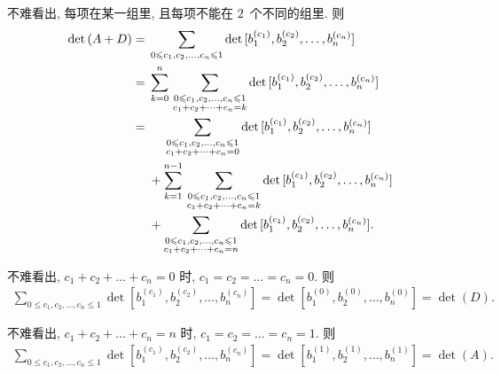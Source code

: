 \documentclass[../libro.tex]{subfiles}
\begin{document}
\begin{example}
    不难看出,
    每项在某一组里,
    且每项不能在 \(2\)~个不同的组里.
    则
    \begin{align*}
        \det {(A + D)}
        = {} &
        \sum_{0 \leq c_1, c_2, \dots, c_n \leq 1}
        \det {[b_1^{(c_1)}, b_2^{(c_2)}, \dots, b_n^{(c_n)}]}
        \\
        = {} &
        \sum_{k = 0}^{n}\,
        \sum_{\substack{0 \leq c_1, c_2, \dots, c_n \leq 1 \\
        c_1 + c_2 + \dots + c_n = k}}
        \det {[b_1^{(c_1)}, b_2^{(c_2)}, \dots, b_n^{(c_n)}]}
        \\
        = {} &
        \hphantom{{} + {}}
        \sum_{\substack{0 \leq c_1, c_2, \dots, c_n \leq 1 \\
        c_1 + c_2 + \dots + c_n = 0}}
        \det {[b_1^{(c_1)}, b_2^{(c_2)}, \dots, b_n^{(c_n)}]}
        \\
        &
        +
        \sum_{k = 1}^{n-1}\,
        \sum_{\substack{0 \leq c_1, c_2, \dots, c_n \leq 1 \\
        c_1 + c_2 + \dots + c_n = k}}
        \det {[b_1^{(c_1)}, b_2^{(c_2)}, \dots, b_n^{(c_n)}]}
        \\
        &
        +
        \sum_{\substack{0 \leq c_1, c_2, \dots, c_n \leq 1 \\
        c_1 + c_2 + \dots + c_n = n}}
        \det {[b_1^{(c_1)}, b_2^{(c_2)}, \dots, b_n^{(c_n)}]}.
    \end{align*}

    不难看出, \(c_1 + c_2 + \dots + c_n = 0\) 时,
    \(c_1 = c_2 = \dots = c_n = 0\).
    则
    \begin{align*}
        \sum_{0 \leq c_1, c_2, \dots, c_n \leq 1}
        \det {[b_1^{(c_1)}, b_2^{(c_2)}, \dots, b_n^{(c_n)}]}
        =
        \det {[b_1^{(0)}, b_2^{(0)}, \dots, b_n^{(0)}]}
        =
        \det {(D)}.
    \end{align*}

    不难看出, \(c_1 + c_2 + \dots + c_n = n\) 时,
    \(c_1 = c_2 = \dots = c_n = 1\).
    则
    \begin{align*}
        \sum_{0 \leq c_1, c_2, \dots, c_n \leq 1}
        \det {[b_1^{(c_1)}, b_2^{(c_2)}, \dots, b_n^{(c_n)}]}
        =
        \det {[b_1^{(1)}, b_2^{(1)}, \dots, b_n^{(1)}]}
        =
        \det {(A)}.
    \end{align*}


\end{example}
\end{document}
